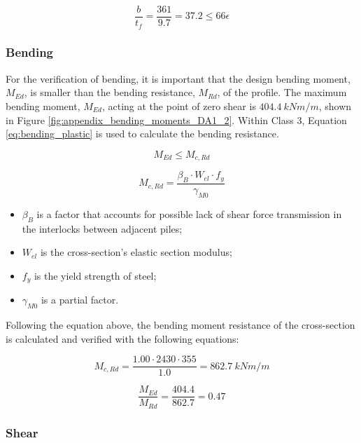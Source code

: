 \begin{equation}
    \frac{b}{t_{f}} = \frac{361}{9.7} = 37.2 \leq 66 \epsilon 
    \label{eq:class}
\end{equation}

\subsubsection{Bending}

For the verification of bending, it is important that the design bending moment, $M_{Ed}$, is smaller than the bending resistance, $M_{Rd}$, of the profile. The maximum bending moment, $M_{Ed}$, acting at the point of zero shear is $404.4 \ kNm/m$, shown in Figure \ref{fig:appendix_bending_moments_DA1_2}. Within Class 3, Equation \ref{eq:bending_plastic} is used to calculate the bending resistance.

\begin{equation}
    M_{Ed} \leq M_{c,Rd}
\end{equation}

\begin{equation}
    M_{c,Rd} = \frac{\beta_{B} \cdot W_{el} \cdot f_{y}}{\gamma_{M0}}
    \label{eq:bending_plastic}
\end{equation}

\begin{itemize}
  \item $\beta_B$ is a factor that accounts for possible lack of shear force transmission in the interlocks between adjacent piles;
  \item $W_{el}$ is the cross-section’s elastic section modulus;
  \item $f_y$ is the yield strength of steel;
  \item $\gamma_{M0}$ is a partial factor.
\end{itemize}

Following the equation above, the bending moment resistance of the cross-section is calculated and verified with the following equations:

\begin{equation}
    M_{c,Rd} = \frac{1.00 \cdot 2430 \cdot 355}{1.0} = 862.7 \ kNm/m
\end{equation}

\begin{equation}
    \frac{M_{Ed}}{M_{Rd}} = \frac{404.4}{862.7} = 0.47
\end{equation}

\subsubsection{Shear}

